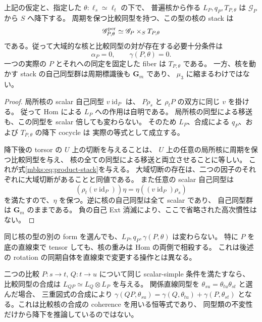\begin{theorem}[指定周期付き核の相対実現判定]
\label{mbks:thm:kernel-criterion}
上記の仮定と、指定した $\theta:\ell_s\simeq\ell_t$ の下で、
普遍核から作る $L_P,q_P,T_{P,\theta}$ は $\mathscr G_P$ から $S$ へ降下する。
周期を保つ比較同型を持つ、この型の核の stack は
\begin{equation}\label{mbks:eq:product-stack}
 \mathscr G_{P,\theta}^{\rm per}
       \simeq\mathscr G_P\times_S T_{P,\theta}
\end{equation}
である。従って大域的な核と比較同型の対が存在する必要十分条件は
\begin{equation}\label{mbks:eq:two-obstructions}
 \alpha_P=0,\qquad \gamma(P,\theta)=0.
\end{equation}
一つの実際の $P$ とそれへの同定を固定した fiber は $T_{P,\theta}$ である。
一方、核を動かす stack の自己同型群は周期標識後も $\mathbf G_m$ であり、
$\mu_3$ に縮まるわけではない。
\end{theorem}
\begin{proof}
局所核の scalar 自己同型 $v\operatorname{id}_P$ は、
$P\rho_s$ と $\rho_tP$ の双方に同じ $v$ を掛ける。
従って Hom による $L_P$ への作用は自明である。
局所核の同型による移送も、この同型を scalar 倍しても変わらない。
そのため $L_P$、合成による $q_P$、および $T_{P,\theta}$ の降下 cocycle は
実際の等式として成立する。

降下後の torsor の $U$ 上の切断を与えることは、
$U$ 上の任意の局所核に周期を保つ比較同型を与え、
核の全ての同型による移送と両立させることに等しい。
これが式\eqref{mbks:eq:product-stack}を与える。
大域切断の存在は、二つの因子のそれぞれに大域切断があることと同値である。
また任意の scalar 自己同型は
\[
 (\rho_t(v\operatorname{id}_P))\eta
      =\eta((v\operatorname{id}_P)\rho_s)
\]
を満たすので、$\eta$ を保つ。逆に核の自己同型は全て scalar であり、
自己同型群は $\mathbf G_m$ のままである。
負の自己 Ext 消滅により、ここで省略された高次慣性はない。
\end{proof}

\begin{remark}[実現型と比較の合成]
\label{mbks:rem:composition}
同じ核の型の別の form を選んでも、$L_P,q_P,\gamma(P,\theta)$ は変わらない。
特に $P$ を底の直線束で tensor しても、核の重みは Hom の両側で相殺する。
これは後述の rotation の同期自体を直線束で変更する操作とは異なる。

二つの比較 $P:s\to t$, $Q:t\to u$ について同じ scalar-simple 条件を満たすなら、
比較同型の合成は
$L_{QP}\simeq L_Q\otimes L_P$ を与える。
関係直線同型を $\theta_{su}=\theta_{tu}\theta_{st}$ と選んだ場合、
三重図式の合成により
$\gamma(QP,\theta_{su})=\gamma(Q,\theta_{tu})+\gamma(P,\theta_{st})$
となる。これは比較核の合成の coherence を用いる恒等式であり、
同型類の不変性だけから降下を推論しているのではない。
\end{remark}

